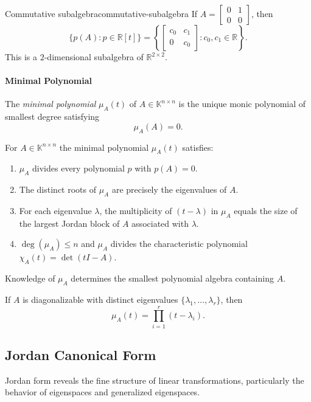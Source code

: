 \begin{example}{Commutative subalgebra}{commutative-subalgebra}
    If $A=\begin{bmatrix}0&1\\0&0\end{bmatrix}$, then
    \[
        \{p(A):p\in\mathbb{R}[t]\}=\left\{\begin{bmatrix}c_0&c_1\\0&c_0\end{bmatrix}:c_0,c_1\in\mathbb{R}\right\}.
    \]
    This is a $2$-dimensional subalgebra of $\mathbb{R}^{2\times 2}$.
\end{example}

\paragraph{Minimal Polynomial}
The \emph{minimal polynomial} $\mu_A(t)$ of $A\in\mathbb{K}^{n\times n}$ is the unique monic polynomial of smallest degree satisfying
\[
    \mu_A(A)=0.
\]

For $A\in\mathbb{K}^{n\times n}$ the minimal polynomial $\mu_A(t)$ satisfies:
\begin{enumerate}
    \item $\mu_A$ divides every polynomial $p$ with $p(A)=0$.
    \item The distinct roots of $\mu_A$ are precisely the eigenvalues of $A$.
    \item For each eigenvalue $\lambda$, the multiplicity of $(t-\lambda)$ in $\mu_A$ equals the size of the largest Jordan block of $A$ associated with $\lambda$.
    \item $\deg(\mu_A)\le n$ and $\mu_A$ divides the characteristic polynomial $\chi_A(t)=\det(tI-A)$.
\end{enumerate}
Knowledge of $\mu_A$ determines the smallest polynomial algebra containing $A$.

\begin{example}
    If $A$ is diagonalizable with distinct eigenvalues $\{\lambda_1,\dots,\lambda_r\}$, then
    \[
        \mu_A(t)=\prod_{i=1}^r (t-\lambda_i).
    \]
\end{example}

\subsection{Jordan Canonical Form}

Jordan form reveals the fine structure of linear transformations, particularly the behavior of eigenspaces and generalized eigenspaces.

